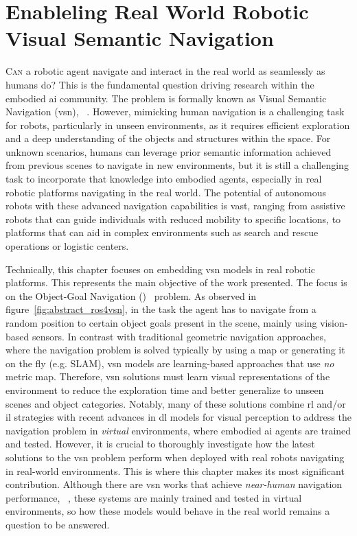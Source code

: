 \chapter{Enableling Real World Robotic Visual Semantic Navigation}\label{ch:ros4vsn:-enable-real-world-robotic-visual-semantic-navigation}

\lettrine{\textcolor{accent_color}{C}}{an} a robotic agent navigate and interact in the real world as seamlessly as humans do?
This is the fundamental question driving research within the embodied \acrshort{ai} community.
The problem is formally known as Visual Semantic Navigation (\acrshort{vsn}), \eg~\cite{ramrakhya2023,Cai2024DGMemLV,chang2020}.
However, mimicking human navigation is a challenging task for robots, particularly in unseen environments, as it requires efficient exploration and a deep understanding of the objects and structures within the space.
For unknown scenarios, humans can leverage prior semantic information achieved from previous scenes to navigate in new environments, but it is still a challenging task to incorporate that knowledge into embodied agents, especially in real robotic platforms navigating in the real world.
The potential of autonomous robots with these advanced navigation capabilities is vast, ranging from assistive robots that can guide individuals with reduced mobility to specific locations, to platforms that can aid in complex environments such as search and rescue operations or logistic centers.

Technically, this chapter focuses on embedding \acrshort{vsn} models in real robotic platforms.
This represents the main objective of the work presented.
The focus is on the Object-Goal Navigation (\objnav)~\cite{batra2020} problem.
As observed in figure~\ref{fig:abstract_ros4vsn}, in the \objnav task the agent has to navigate from a random position to certain object goals present in the scene, mainly using vision-based sensors.
In contrast with traditional geometric navigation approaches, where the navigation problem is solved typically by using a map or generating it on the fly (e.g. SLAM), \acrshort{vsn} models are learning-based approaches that use \emph{no} metric map.
Therefore, \acrshort{vsn} solutions must learn visual representations of the environment to reduce the exploration time and better generalize to unseen scenes and object categories.
Notably, many of these solutions combine \acrshort{rl} and/or \acrshort{il} strategies with recent advances in \acrshort{dl} models for visual perception to address the navigation problem in \emph{virtual} environments, where embodied \acrshort{ai} agents are trained and tested.
However, it is crucial to thoroughly investigate how the latest solutions to the \acrshort{vsn} problem perform when deployed with real robots navigating in real-world environments.
This is where this chapter makes its most significant contribution.
Although there are \acrshort{vsn} works that achieve \textit{near-human} navigation performance, \eg~\cite{ramrakhya2023}, these systems are mainly trained and tested in virtual environments, so how these models would behave in the real world remains a question to be answered.

